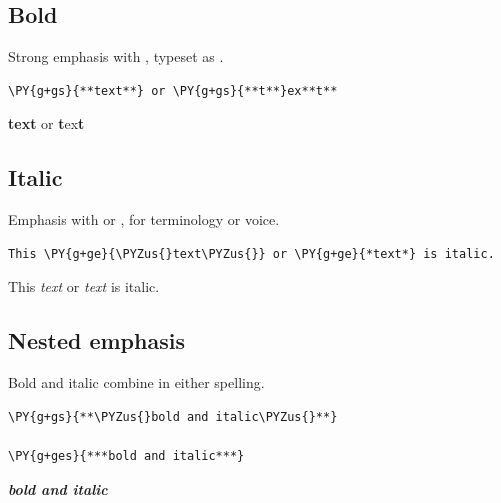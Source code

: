 \documentclass[a4paper,twoside]{article}
\begin{document}
\subsection{Bold}
Strong emphasis with \tscodeinline{**}, typeset as .
\begin{tscode}[lang=md, engine=pygments]
\begin{Verbatim}[commandchars=\\\{\},breaklines, breakanywhere, commandchars=\\\{\}]
\PY{g+gs}{**text**} or \PY{g+gs}{**t**}ex**t**
\end{Verbatim}
\end{tscode}
\begin{displayquote}
\textbf{text} or \textbf{t}ex\textbf{t}
\end{displayquote}
\subsection{Italic}
Emphasis with \tscodeinline{*} or \tscodeinline{\_}, for terminology or voice.
\begin{tscode}[lang=md, engine=pygments]
\begin{Verbatim}[commandchars=\\\{\},breaklines, breakanywhere, commandchars=\\\{\}]
This \PY{g+ge}{\PYZus{}text\PYZus{}} or \PY{g+ge}{*text*} is italic.
\end{Verbatim}
\end{tscode}
\begin{displayquote}
This \emph{text} or \emph{text} is italic.
\end{displayquote}
\subsection{Nested emphasis}
Bold and italic combine in either spelling.
\begin{tscode}[lang=md, engine=pygments]
\begin{Verbatim}[commandchars=\\\{\},breaklines, breakanywhere, commandchars=\\\{\}]
\PY{g+gs}{**\PYZus{}bold and italic\PYZus{}**}

\PY{g+ges}{***bold and italic***}
\end{Verbatim}
\end{tscode}
\begin{displayquote}

\emph{\textbf{bold and italic}}
\end{displayquote}
\end{document}
